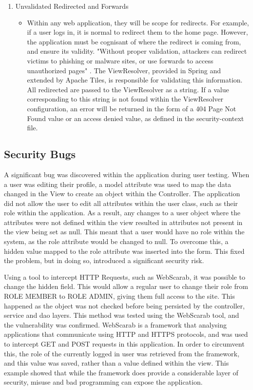 \begin{enumerate}
\item Unvalidated Redirected and Forwards
\begin{itemize}
\item Within any web application, they will be scope for redirects. For example, if a user logs in, it is normal to redirect them to the home page. However, the application must be cognisant of where the redirect is coming from, and ensure its validity. "Without proper validation, attackers can redirect victims to phishing or malware sites, or use forwards to access unauthorized pages" \parencite{owasp2013}. The ViewResolver, provided in Spring and extended by Apache Tiles, is responsible for validating this information. All redirected are passed to the ViewResolver as a string. If a value corresponding to this string is not found within the ViewResolver configuration, an error will be returned in the form of a 404 Page Not Found value or an access denied value, as defined in the security-context file. 
\end{itemize}
\end{enumerate}

\subsection{Security Bugs}

A significant bug was discovered within the application during user testing. When a user was editing their profile, a model attribute was used to map the data changed in the View to create an object within the Controller. The application did not allow the user to edit all attributes within the user class, such as their role within the application. As a result, any changes to a user object where the attributes were not defined within the view resulted in attributes not present in the view being set as null. This meant that a user would have no role within the system, as the role attribute would be changed to null. To overcome this, a hidden value mapped to the role attribute was inserted into the form. This fixed the problem, but in doing so, introduced a significant security risk. 

Using a tool to intercept HTTP Requests, such as WebScarab, it was possible to change the hidden field. This would allow a regular user to change their role from ROLE MEMBER to ROLE ADMIN, giving them full access to the site. This happened as the object was not checked before being persisted by the controller, service and dao layers. This method was tested using the WebScarab tool, and the vulnerability was confirmed. WebScarab is a framework that analysing applications that communicate using HTTP and HTTPS protocols, and was used to intercept GET and POST requests in this application. In order to circumvent this, the role of the currently logged in user was retrieved from the framework, and this value was saved, rather than a value defined within the view. This example showed that while the framework does provide a considerable layer of security, misuse and bad programming can expose the application. 

